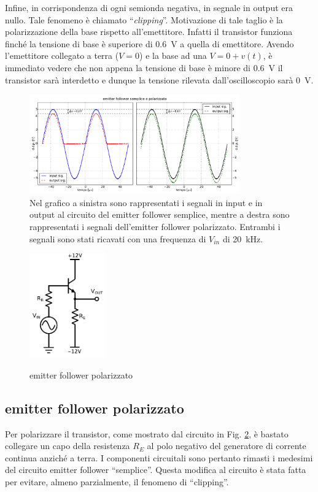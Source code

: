 Infine, in corrispondenza di ogni semionda negativa, in segnale in output era nullo.
Tale fenomeno è chiamato ``\emph{clipping}''.
Motivazione di tale taglio è la polarizzazione della base rispetto all'emettitore.
Infatti il transistor funziona finché la tensione di base è superiore di \SI{0.6}{\volt} a quella di emettitore.
Avendo l'emettitore collegato a terra ($V=0$) e la base ad una $V=0+v(t)$, è immediato vedere che non appena la tensione di base è minore di \SI{0.6}{\volt} il transistor sarà interdetto e dunque la tensione rilevata dall'oscilloscopio sarà \SI{0}{\volt}.

\begin{figure}[H]
\centering
	\includegraphics[width=0.81\textwidth]{cc3+cc4.pdf}
	\caption{Nel grafico a sinistra sono rappresentati i segnali in input e in output al circuito del emitter follower semplice, mentre a destra sono rappresentati i segnali dell'emitter follower polarizzato. Entrambi i segnali sono stati ricavati con una frequenza di $V_{in}$ di \SI{20}{\kilo\hertz}.}
	\label{fig:cc3+cc4}
\end{figure}

\begin{figure}
	\caption{emitter follower polarizzato}
	\includegraphics[height=45mm]{cc4.pdf}
	\label{fig:cc4}
\end{figure}

\subsection{emitter follower polarizzato}
Per polarizzare il transistor, come mostrato dal circuito in Fig. \ref{fig:cc4}, è bastato collegare un capo della resistenza $R_E$ al polo negativo del generatore di corrente continua anziché a terra.
I componenti circuitali sono pertanto rimasti i medesimi del circuito emitter follower ``semplice''.
Questa modifica al circuito è stata fatta per evitare, almeno parzialmente, il fenomeno di ``clipping''.

